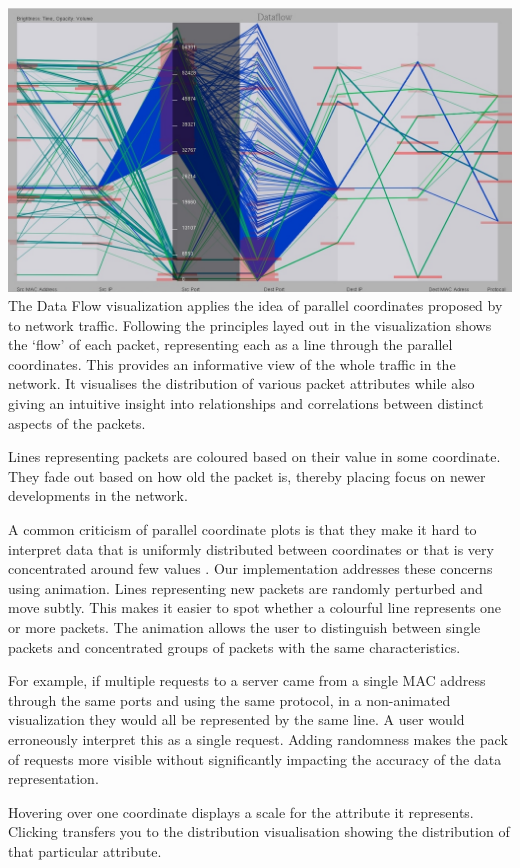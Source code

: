 \includegraphics[width=\linewidth]{materials/dataflow.jpg}
The Data Flow visualization applies the idea of parallel coordinates proposed by \cite{inselberg1985plane} to network traffic. Following the principles layed out in \cite{fliggnetwork} the visualization shows the `flow' of each packet, representing each as a line through the parallel coordinates. This provides an informative view of the whole traffic in the network. It visualises the distribution of various packet attributes while also giving an intuitive insight into relationships and correlations between distinct aspects of the packets.

Lines representing packets are coloured based on their value in some coordinate. They fade out based on how old the packet is, thereby placing focus on newer developments in the network. 

A common criticism of parallel coordinate plots is that they make it hard to interpret data that is uniformly distributed between coordinates or that is very concentrated around few values \cite{marty2009applied}. Our implementation addresses these concerns using animation. Lines representing new packets are randomly perturbed and move subtly. This makes it easier to spot whether a colourful line represents one or more packets. The animation allows the user to distinguish between single packets and concentrated groups of packets with the same characteristics.

For example, if multiple requests to a server came from a single MAC address through the same ports and using the same protocol, in a non-animated visualization they would all be represented by the same line. A user would erroneously interpret this as a single request. Adding randomness makes the pack of requests more visible without significantly impacting the accuracy of the data representation.

Hovering over one coordinate displays a scale for the attribute it represents. Clicking transfers you to the distribution visualisation showing the distribution of that particular attribute.
